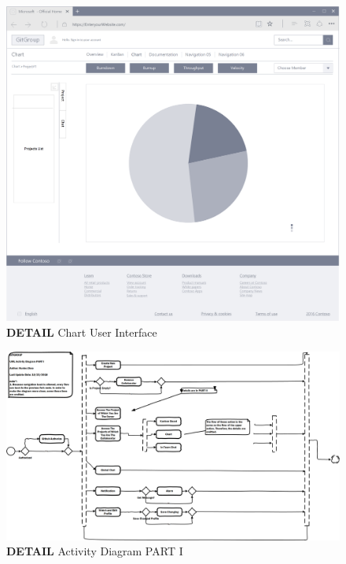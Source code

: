 \documentclass[12pt,a4paper]{report}
\begin{document}
\begin{figure}[h]
	\centering
	\includegraphics[width=\textwidth]{./pics/ChartInterface.png}
	\caption{\textbf{DETAIL} Chart User Interface}
\end{figure}

\begin{figure}[h]
	\centering
	\includegraphics[scale=0.5,angle=90]{./pics/ActivatyDiagramPARTI.png}
	\caption{\textbf{DETAIL} Activity Diagram PART I}
	\label{fig1}
\end{figure}
\end{document}
